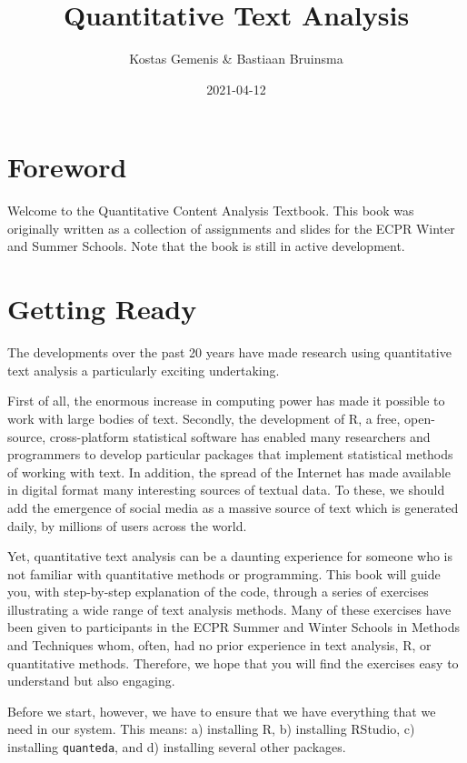 \documentclass[
]{book}
\title{Quantitative Text Analysis}
\author{Kostas Gemenis \& Bastiaan Bruinsma}
\date{2021-04-12}
\begin{document}
\maketitle

{
\setcounter{tocdepth}{1}
\tableofcontents
}
\hypertarget{foreword}{%
\chapter{Foreword}\label{foreword}}

Welcome to the Quantitative Content Analysis Textbook. This book was originally written as a collection of assignments and slides for the ECPR Winter and Summer Schools. Note that the book is still in active development.

\hypertarget{getting-ready}{%
\chapter{Getting Ready}\label{getting-ready}}

The developments over the past 20 years have made research using quantitative text analysis a particularly exciting undertaking.

First of all, the enormous increase in computing power has made it possible to work with large bodies of text. Secondly, the development of R, a free, open-source, cross-platform statistical software has enabled many researchers and programmers to develop particular packages that implement statistical methods of working with text. In addition, the spread of the Internet has made available in digital format many interesting sources of textual data. To these, we should add the emergence of social media as a massive source of text which is generated daily, by millions of users across the world.

Yet, quantitative text analysis can be a daunting experience for someone who is not familiar with quantitative methods or programming. This book will guide you, with step-by-step explanation of the code, through a series of exercises illustrating a wide range of text analysis methods. Many of these exercises have been given to participants in the ECPR Summer and Winter Schools in Methods and Techniques whom, often, had no prior experience in text analysis, R, or quantitative methods. Therefore, we hope that you will find the exercises easy to understand but also engaging.

Before we start, however, we have to ensure that we have everything that we need in our system. This means: a) installing R, b) installing RStudio, c) installing \texttt{quanteda}, and d) installing several other packages.
\end{document}
